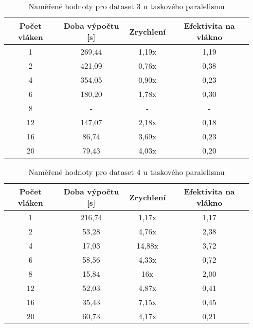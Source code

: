 \documentclass[a4paper,10pt]{article}
\begin{document}
\begin{table}[H]
\centering
\begin{tabular}{|c|c|c|c|}
\hline
Počet vláken & Doba výpočtu {[}s{]} & Zrychlení & Efektivita na vlákno \\ \hline
1            & 269,44               & 1,19x     & 1,19                 \\
2            & 421,09               & 0,76x     & 0,38                 \\
4            & 354,05               & 0,90x     & 0,23                 \\
6            & 180,20               & 1,78x     & 0,30                 \\
8            & -                    & -         & -                    \\
12           & 147,07               & 2,18x     & 0,18                 \\
16           & 86,74                & 3,69x     & 0,23                 \\
20           & 79,43                & 4,03x     & 0,20                 \\ \hline
\end{tabular}
\caption{Naměřené hodnoty pro dataset 3 u taskového paralelismu}
\end{table}

\begin{table}[H]
\centering
\begin{tabular}{|c|c|c|c|}
\hline
Počet vláken & Doba výpočtu {[}s{]} & Zrychlení & Efektivita na vlákno \\ \hline
1            & 216,74               & 1,17x     & 1,17                 \\
2            & 53,28                & 4,76x     & 2,38                 \\
4            & 17,03                & 14,88x    & 3,72                 \\
6            & 58,56                & 4,33x     & 0,72                 \\
8            & 15,84                & 16x       & 2,00                 \\
12           & 52,03                & 4,87x     & 0,41                 \\
16           & 35,43                & 7,15x     & 0,45                 \\
20           & 60,73                & 4,17x     & 0,21                 \\ \hline
\end{tabular}
\caption{Naměřené hodnoty pro dataset 4 u taskového paralelismu}
\end{table}
\end{document}
